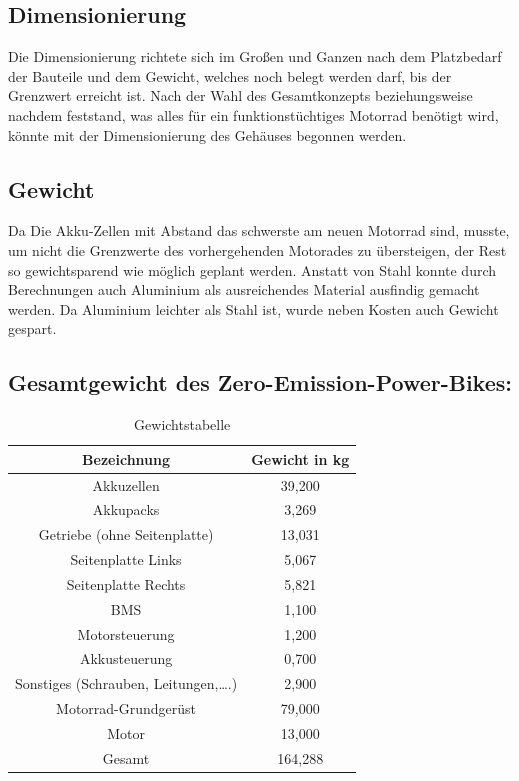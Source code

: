 \newpage

\subsection{Dimensionierung}
Die Dimensionierung richtete sich im Großen und Ganzen nach dem Platzbedarf der Bauteile und dem Gewicht, welches noch belegt werden darf, bis der Grenzwert erreicht ist. Nach der Wahl des Gesamtkonzepts beziehungsweise nachdem feststand, was alles für ein funktionstüchtiges Motorrad benötigt wird, könnte mit der Dimensionierung des Gehäuses begonnen werden. 

\subsection{Gewicht}
Da Die Akku-Zellen mit Abstand das schwerste am neuen Motorrad sind, musste, um nicht die Grenzwerte des vorhergehenden Motorades zu übersteigen, der Rest so gewichtsparend wie möglich geplant werden. Anstatt von Stahl konnte durch Berechnungen auch Aluminium als ausreichendes Material ausfindig gemacht werden. Da Aluminium leichter als Stahl ist, wurde neben Kosten auch Gewicht gespart. 

\subsection{Gesamtgewicht des Zero-Emission-Power-Bikes:}
\begin{table} [H]
	\begin{center}
		\begin{tabular}{|c|c|}
		\hline
		Bezeichnung 						& Gewicht in kg \\ \hline
		Akkuzellen  						& 39,200        \\ \hline
		Akkupacks   						& 3,269         \\ \hline
		Getriebe (ohne Seitenplatte)   	 	& 13,031  		\\ \hline   
		Seitenplatte Links					& 5,067			\\ \hline
		Seitenplatte Rechts					& 5,821			\\ \hline
		BMS									& 1,100			\\ \hline
		Motorsteuerung						& 1,200			\\ \hline
		Akkusteuerung						& 0,700			\\ \hline
		Sonstiges (Schrauben, Leitungen,….) & 2,900			\\ \hline
		Motorrad-Grundgerüst				& 79,000		\\ \hline
		Motor								& 13,000		\\ \hline
		Gesamt								& 164,288		\\ \hline
		\end{tabular}
		\caption{Gewichtstabelle}
	\end{center}
\end{table}



